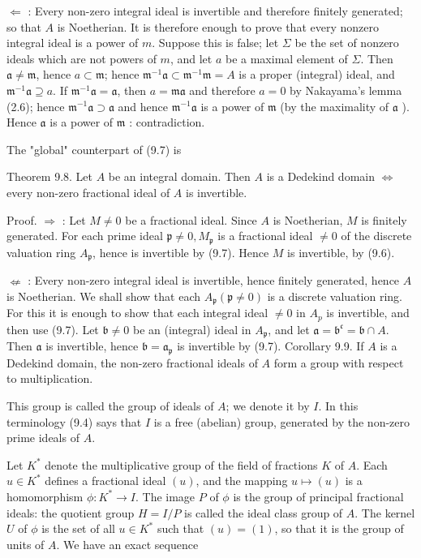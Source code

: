 \documentclass{standalone}
\theoremstyle{definition}
\theoremstyle{remark}
\begin{document}
$\Leftarrow$ : Every non-zero integral ideal is invertible and therefore finitely generated; so that $A$ is Noetherian. It is therefore enough to prove that every nonzero integral ideal is a power of $m$. Suppose this is false; let $\Sigma$ be the set of nonzero ideals which are not powers of $m$, and let $a$ be a maximal element of $\Sigma$. Then $\mathfrak{a} \neq \mathfrak{m}$, hence $a \subset \mathfrak{m}$; hence $\mathfrak{m}^{-1} \mathfrak{a} \subset \mathfrak{m}^{-1} \mathfrak{m}=A$ is a proper (integral) ideal, and $\mathfrak{m}^{-1} \mathfrak{a} \supseteq a$. If $\mathfrak{m}^{-1} \mathfrak{a}=\mathfrak{a}$, then $a=\mathfrak{m} \mathfrak{a}$ and therefore $a=0$ by Nakayama's lemma (2.6); hence $\mathfrak{m}^{-1} \mathfrak{a} \supset \mathfrak{a}$ and hence $\mathfrak{m}^{-1} \mathfrak{a}$ is a power of $\mathfrak{m}$ (by the maximality of $\mathfrak{a}$ ). Hence $\mathfrak{a}$ is a power of $\mathfrak{m}$ : contradiction.

The "global" counterpart of (9.7) is

Theorem 9.8. Let $A$ be an integral domain. Then $A$ is a Dedekind domain $\Leftrightarrow$ every non-zero fractional ideal of $A$ is invertible.

Proof. $\Rightarrow$ : Let $M \neq 0$ be a fractional ideal. Since $A$ is Noetherian, $M$ is finitely generated. For each prime ideal $\mathfrak{p} \neq 0, M_{\mathfrak{p}}$ is a fractional ideal $\neq 0$ of the discrete valuation ring $A_{\mathfrak{p}}$, hence is invertible by (9.7). Hence $M$ is invertible, by (9.6).

$\nLeftarrow$ : Every non-zero integral ideal is invertible, hence finitely generated, hence $A$ is Noetherian. We shall show that each $A_{\mathfrak{p}}(\mathfrak{p} \neq 0)$ is a discrete valuation ring. For this it is enough to show that each integral ideal $\neq 0$ in $A_{p}$ is invertible, and then use (9.7). Let $\mathfrak{b} \neq 0$ be an (integral) ideal in $A_{\mathfrak{p}}$, and let $\mathfrak{a}=\mathfrak{b}^{\mathfrak{c}}=\mathfrak{b} \cap A$. Then $\mathfrak{a}$ is invertible, hence $\mathfrak{b}=\mathfrak{a}_{\mathfrak{p}}$ is invertible by (9.7). Corollary 9.9. If $A$ is a Dedekind domain, the non-zero fractional ideals of $A$ form a group with respect to multiplication.

This group is called the group of ideals of $A$; we denote it by $I$. In this terminology (9.4) says that $I$ is a free (abelian) group, generated by the non-zero prime ideals of $A$.

Let $K^{*}$ denote the multiplicative group of the field of fractions $K$ of $A$. Each $u \in K^{*}$ defines a fractional ideal $(u)$, and the mapping $u \mapsto(u)$ is a homomorphism $\phi: K^{*} \rightarrow I$. The image $P$ of $\phi$ is the group of principal fractional ideals: the quotient group $H=I / P$ is called the ideal class group of $A$. The kernel $U$ of $\phi$ is the set of all $u \in K^{*}$ such that $(u)=(1)$, so that it is the group of units of $A$. We have an exact sequence
\end{document}
